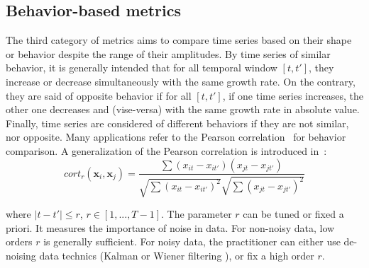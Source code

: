 \subsection{Behavior-based metrics}

The third category of metrics aims to compare time series based on their shape or behavior despite the range of their amplitudes. By time series of similar behavior, it is generally intended that for all temporal window $[t,t']$, they increase or decrease simultaneously with the same growth rate. On the contrary, they are said of opposite behavior if for all $[t,t']$, if one time series increases, the other one decreases and (vise-versa) with the same growth rate in absolute value. Finally, time series are considered of different behaviors if they are not similar, nor opposite. Many applications refer to the Pearson correlation~\cite{Abraham2010a,Benesty2009} for behavior comparison. A generalization of the Pearson correlation is introduced in~\cite{AhlameDouzal-Chouakria2011}: 
\begin{equation}	
	cort_r(\textbf{x}_i,\textbf{x}_j) = 
	\frac{
		\sum 
		{
			(x_{it}-x_{it'})
			(x_{jt}-x_{jt'})
		}
	}
	{
		\sqrt{
			\sum 
			{(x_{it}-x_{it'})^2}
		} 
		\sqrt{
			\sum 
			{(x_{jt}-x_{jt'})^2}
		} 	 
	}
\label{eq:corTr}
\end{equation}

\noindent where $|t-t'| \leq r$, $r \in [1,..., T-1]$. The parameter $r$ can be tuned or fixed a priori. It measures the importance of noise in data. For non-noisy data, low orders $r$ is generally sufficient. For noisy data, the practitioner can either use de-noising data technics (Kalman or Wiener filtering \cite{Kalman1960,WienerN1942}), or fix a high order $r$.

